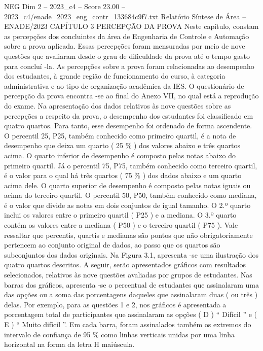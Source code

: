 \begin{textsample}{NEG Dim 2 – 2023\_c4 – Score 23.00 – 2023\_c4/enade\_2023\_eng\_contr\_133684c9f7.txt}  \label{ex:f2_neg_420}
Relatório Síntese de Área – ENADE/2023 CAPÍTULO 3 PERCEPÇÃO DA PROVA Neste capítulo, constam as percepções dos concluintes da área de Engenharia de Controle e Automação sobre a prova aplicada.
Essas percepções foram mensuradas por meio de nove questões que avaliaram desde o grau de dificuldade da prova até o tempo gasto para concluí -la.
As percepções sobre a prova foram relacionadas ao desempenho dos estudantes, à grande região de funcionamento do curso, à categoria administrativa e ao tipo de organização acadêmica da IES.
O questionário de percepção da prova encontra -se ao final do Anexo VII, no qual está a reprodução do exame.
Na apresentação dos dados relativos às nove questões sobre as percepções a respeito da prova, o desempenho dos estudantes foi classificado em quatro quartos.
Para tanto, esse desempenho foi ordenado de forma ascendente.
O percentil 25, P25, também conhecido como primeiro quartil, é a nota de desempenho que deixa um quarto ( 25 \% ) dos valores abaixo e três quartos acima.
O quarto inferior de desempenho é composto pelas notas abaixo do primeiro quartil.
Já o percentil 75, P75, também conhecido como terceiro quartil, é o valor para o qual há três quartos ( 75 \% ) dos dados abaixo e um quarto acima dele.
O quarto superior de desempenho é composto pelas notas iguais ou acima do terceiro quartil.
O percentil 50, P50, também conhecido como mediana, é o valor que divide as notas em dois conjuntos de igual tamanho.
O 2.º quarto inclui os valores entre o primeiro quartil ( P25 ) e a mediana.
O 3.º quarto contém os valores entre a mediana ( P50 ) e o terceiro quartil ( P75 ).
Vale ressaltar que percentis, quartis e medianas são pontos que não obrigatoriamente pertencem ao conjunto original de dados, ao passo que os quartos são subconjuntos dos dados originais.
Na Figura 3.1, apresenta -se uma ilustração dos quatro quartos descritos.
A seguir, serão apresentados gráficos com resultados selecionados, relativos às nove questões avaliadas por grupos de estudantes.
Nas barras dos gráficos, apresenta -se o percentual de estudantes que assinalaram uma das opções ou a soma das porcentagens daqueles que assinalaram duas ( ou três ) delas.
Por exemplo, para as questões 1 e 2, nos gráficos é apresentada a porcentagem total de participantes que assinalaram as opções ( D ) “ Difícil ” e ( E ) “ Muito difícil ”.
Em cada barra, foram assinalados também os extremos do intervalo de confiança de 95 \% como linhas verticais unidas por uma linha horizontal na forma da letra H maiúscula.

\end{textsample}
